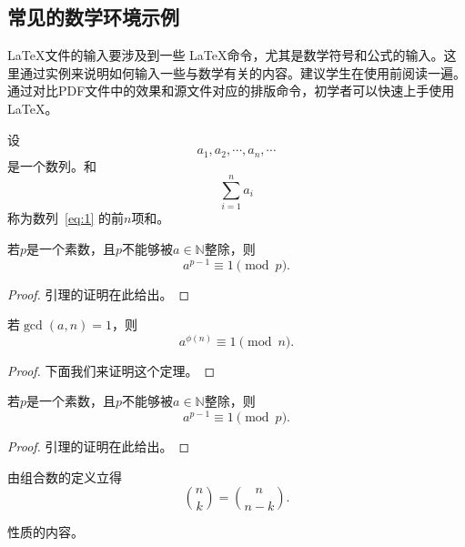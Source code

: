 \subsection{常见的数学环境示例}
\LaTeX 文件的输入要涉及到一些 \LaTeX 命令，尤其是数学符号和公式的输入。这里通过实例来说明如何输入一些与数学有关的内容。建议学生在使用前阅读一遍。通过对比PDF文件中的效果和源文件对应的排版命令，初学者可以快速上手使用\LaTeX 。
\begin{definition}
	设
	\begin{equation}\label{eq:1}
		a_1,a_2,\cdots, a_n, \cdots
	\end{equation}
	是一个数列。和
	$$\sum_{i=1}^n a_i$$
	称为数列~\eqref{eq:1} 的前$n$项和。
\end{definition}
\begin{lemma}[新定理]
	若$p$是一个素数，且$p$不能够被$a\in \mathbb{N}$整除，则
	$$a^{p-1}\equiv 1\pmod{p}.$$
\end{lemma}
\begin{proof}
	引理的证明在此给出。
\end{proof}
\begin{theorem}\label{thm:euola}
	若$\gcd(a,n) = 1$，则
	$$a^{\phi(n)}\equiv 1\pmod{n}.$$
\end{theorem}
\begin{proof}
	下面我们来证明这个定理。
\end{proof}
\begin{lemma}
	若$p$是一个素数，且$p$不能够被$a\in \mathbb{N}$整除，则
	$$a^{p-1}\equiv 1\pmod{p}.$$
\end{lemma}
\begin{proof}
	引理的证明在此给出。
\end{proof}
\begin{corollary} 由组合数的定义立得
	$$\binom{n}{k}=\binom{n}{n-k}.$$
\end{corollary}
\begin{property}
	性质的内容。
\end{property}

